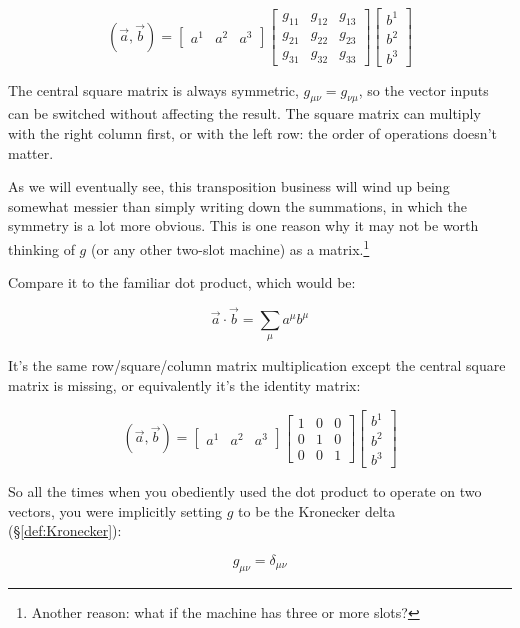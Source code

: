 $$
(\vec{a}, \vec{b}) =
\begin{bmatrix}
a^1 & a^2 & a^3
\end{bmatrix}
\begin{bmatrix}
g_{11} & g_{12} & g_{13} \\
g_{21} & g_{22} & g_{23} \\
g_{31} & g_{32} & g_{33}
\end{bmatrix}
\begin{bmatrix}
b^1 \\ b^2 \\ b^3
\end{bmatrix}
$$

The central square matrix is always symmetric, $g_{\mu\nu} = g_{\nu\mu}$, so the vector inputs can be switched without affecting the result. The square matrix can multiply with the right column first, or with the left row: the order of operations doesn't matter.

As we will eventually see, this transposition business will wind up being somewhat messier than simply writing down the summations, in which the symmetry is a lot more obvious. This is one reason why it may not be worth thinking of $g$ (or any other two-slot machine) as a matrix.\footnote{Another reason: what if the machine has three or more slots?}

Compare it to the familiar dot product, which would be:

$$
\vec{a} \cdot \vec{b} = \sum_{\mu} a^\mu b^\mu
$$

It's the same row/square/column matrix multiplication except the central square matrix is missing, or equivalently it's the identity matrix:

$$
(\vec{a}, \vec{b}) =
\begin{bmatrix}
a^1 & a^2 & a^3
\end{bmatrix}
\begin{bmatrix}
1 & 0 & 0 \\
0 & 1 & 0 \\
0 & 0 & 1
\end{bmatrix}
\begin{bmatrix}
b^1 \\ b^2 \\ b^3
\end{bmatrix}
$$

So all the times when you obediently used the dot product to operate on two vectors, you were implicitly setting $g$ to be the Kronecker delta (§\ref{def:Kronecker}):

$$
g_{\mu\nu} = \delta_{\mu\nu}
$$

